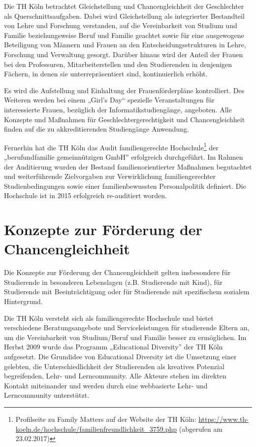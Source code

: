 Die TH Köln betrachtet Gleichstellung und Chancengleichheit der
Geschlechter als Querschnittsaufgaben. Dabei wird Gleichstellung als
integrierter Bestandteil von Lehre und Forschung verstanden, auf die
Vereinbarkeit von Studium und Familie beziehungsweise Beruf und Familie
geachtet sowie für eine ausgewogene Beteiligung von Männern und Frauen
an den Entscheidungsstrukturen in Lehre, Forschung und Verwaltung
gesorgt. Darüber hinaus wird der Anteil der Frauen bei den Professuren,
Mitarbeiterstellen und den Studierenden in denjenigen Fächern, in denen
sie unterrepräsentiert sind, kontinuierlich erhöht.

Es wird die Aufstellung und Einhaltung der Frauenförderpläne
kontrolliert. Des Weiteren werden bei einem „Girl's Day`` spezielle
Veranstaltungen für interessierte Frauen, bezüglich der
Informatikstudiengänge, angeboten. Alle Konzepte und Maßnahmen für
Geschlechtergerechtigkeit und Chancengleichheit finden auf die zu
akkreditierenden Studiengänge Anwendung.

Fernerhin hat die TH Köln das Audit familiengerechte
Hochschule\footnote{Profilseite zu Family Matters auf der Website der TH
  Köln:
  \url{https://www.th-koeln.de/hochschule/familienfreundlichkeit\_3759.php}
  (abgerufen am 23.02.2017)} der „berufundfamilie gemeinnützigen GmbH''
erfolgreich durchgeführt. Im Rahmen der Auditierung wurden der Bestand
familienorientierter Maßnahmen begutachtet und weiterführende
Zielvorgaben zur Verwirklichung familiengerechter Studienbedingungen
sowie einer familienbewussten Personalpolitik definiert. Die Hochschule
ist in 2015 erfolgreich re-auditiert worden.

\section{Konzepte zur Förderung der
Chancengleichheit}\label{konzepte-zur-fuxf6rderung-der-chancengleichheit}

Die Konzepte zur Förderung der Chancengleichheit gelten insbesondere für
Studierende in besonderen Lebenslagen (z.B. Studierende mit Kind), für
Studierende mit Beeinträchtigung oder für Studierende mit spezifischem
sozialem Hintergrund.

Die TH Köln versteht sich als familiengerechte Hochschule und bietet
verschiedene Beratungsangebote und Serviceleistungen für studierende
Eltern an, um die Vereinbarkeit von Studium/Beruf und Familie besser zu
ermöglichen. Im Herbst 2009 wurde das Programm „Educational Diversity''
der TH Köln aufgesetzt. Die Grundidee von Educational Diversity ist die
Umsetzung einer gelebten, die Unterschiedlichkeit der Studierenden als
kreatives Potenzial begreifenden, Lehr- und Lerncommunity. Alle Akteure
stehen im direkten Kontakt miteinander und werden durch eine webbasierte
Lehr- und Lerncommunity unterstützt.

